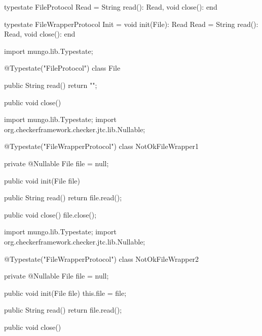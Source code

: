 \begin{code}
typestate FileProtocol {
  Read = {
    String read(): Read,
    void close(): end
  }
}\end{code}

\begin{code}
typestate FileWrapperProtocol {
  Init = {
    void init(File): Read
  }
  Read = {
    String read(): Read,
    void close(): end
  }
}\end{code}

\begin{code}
import mungo.lib.Typestate;

@Typestate("FileProtocol")
class File {

  public String read() {
    return "";
  }

  public void close() {
  }

}\end{code}

\begin{code}
import mungo.lib.Typestate;
import org.checkerframework.checker.jtc.lib.Nullable;

@Typestate("FileWrapperProtocol")
class NotOkFileWrapper1 {

  private @Nullable File file = null;

  public void init(File file) {}

  public String read() {
    return file.read();
  }

  public void close() {
    file.close();
  }

}\end{code}

\begin{code}
import mungo.lib.Typestate;
import org.checkerframework.checker.jtc.lib.Nullable;

@Typestate("FileWrapperProtocol")
class NotOkFileWrapper2 {

  private @Nullable File file = null;

  public void init(File file) {
    this.file = file;
  }

  public String read() {
    return file.read();
  }

  public void close() {

  }

}\end{code}

